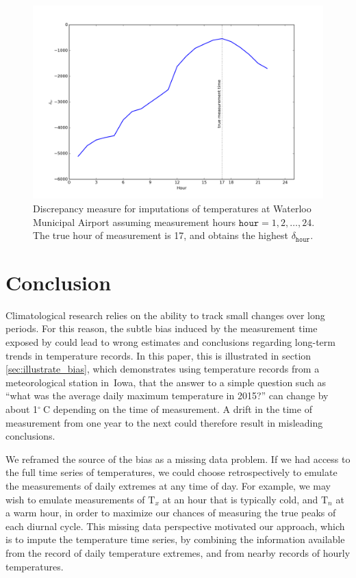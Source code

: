 \documentclass[letter]{article}
\makeatletter
\def\maxwidth{\ifdim\Gin@nat@width>\linewidth\linewidth
\else\Gin@nat@width\fi}
\let\Oldincludegraphics\includegraphics
\renewcommand{\includegraphics}[1]{\Oldincludegraphics[width=0.98\maxwidth]{#1}}
\newcommand{\T}{\mathrm{T}}
\newcommand{\Tn}{\T_{n}}
\newcommand{\Tx}{\T_{x}}
\newcommand{\degreeC}{{}^{\circ}~\mathrm{C}}
\newcommand{\hour}{\mathtt{hour}}
\renewcommand{\cite}[1]{\citep{#1}}
\makeatother
\begin{document}
        \begin{figure}
\centering
\includegraphics{../figures/hr_inference.png}
\caption{\label{fig:hr_inference} Discrepancy measure for imputations of temperatures at Waterloo Municipal Airport assuming measurement hours \(\hour=1,2,\ldots,24\). The true hour of measurement is 17, and obtains the highest \(\delta_\hour\).}
\end{figure}
    


        \section{Conclusion}\label{conclusion}
    


        Climatological research relies on the ability to track small changes over long periods.
For this reason, the subtle bias induced by the measurement time
exposed by \cite{baker1975effect}
could lead to wrong estimates and conclusions regarding long-term trends in temperature records.
In this paper, this is illustrated in section \ref{sec:illustrate_bias},
which demonstrates using temperature records from a meteorological station in~Iowa, that the answer to a simple question such as ``what was the average daily maximum temperature in 2015?'' can change by about 1\(\degreeC\) depending on the time of measurement.
A drift in the time of measurement from one year to the next could therefore result in misleading conclusions.
    


        We reframed the source of the bias as a missing data problem.
If we had access to the full time series of temperatures, we could choose retrospectively to emulate the measurements of daily extremes at any time of day.
For example, we may wish to emulate measurements of \(\Tx\) at an hour that is typically cold, and \(\Tn\) at a warm hour, in order to maximize our chances of measuring the true peaks of each diurnal cycle.
This missing data perspective motivated our approach, which is to impute the temperature time series, by combining the information available from the record of daily temperature extremes,
and from nearby records of hourly temperatures.
\end{document}
